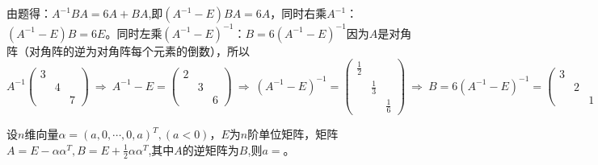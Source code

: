 \documentclass[a4paper]{report}
\begin{document}
\begin{jie}
由题得：$A^{-1}BA=6A+BA$,即$(A^{-1}-E)BA=6A$，同时右乘$A^{-1}$：$(A^{-1}-E)B=6E$。同时左乘$(A^{-1}-E)^{-1}$：$B=6(A^{-1}-E)^{-1}$因为$A$是对角阵（对角阵的逆为对角阵每个元素的倒数），所以
\begin{equation*}
A^{-1}
\begin{pmatrix}
3&&\\
&4&\\
&&7
\end{pmatrix}~\Rightarrow~A^{-1}-E=
\begin{pmatrix}
2&&\\
&3&\\
&&6
\end{pmatrix}~\Rightarrow~(A^{-1}-E)^{-1}=
\begin{pmatrix}
\frac{1}{2}&&\\
&\frac{1}{3}&\\
&&\frac{1}{6}
\end{pmatrix}~\Rightarrow~B=6(A^{-1}-E)^{-1}=
\begin{pmatrix}
3&&\\
&2&\\
&&1
\end{pmatrix}
\end{equation*}
\end{jie}

\EX 设$n$维向量$\alpha=(a,0,\cdots,0,a)^T,(a<0)$，$E$为$n$阶单位矩阵，矩阵$A=E-\alpha\alpha^T,B=E+\frac{1}{2}\alpha\alpha^T$,其中$A$的逆矩阵为$B$,则$a=$\underline{\hphantom{~~~~~~~~~~~}}。
\end{document}
